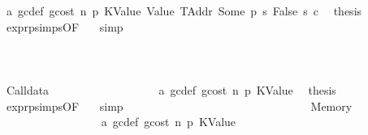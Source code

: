 \begin{isabellebody}
\ a{}\ gc{\isacharunderscore}{\kern0pt}def\ gcost\ n\ p{}\ KValue\ Value\ TAddr\ Some\ p{}\ s{}\ False\ s{}\ c\ \isamarkupfalse%
\ {\isacharquery}{\kern0pt}thesis\ \isamarkupfalse%
\ expr{\isachardot}{\kern0pt}psimps{\isacharparenleft}{\kern0pt}{}{}{\isacharparenright}{\kern0pt}{\isacharbrackleft}{\kern0pt}OF\ {}{}{\isacharparenleft}{\kern0pt}{}{\isacharparenright}{\kern0pt}{\isacharbrackright}{\kern0pt}\ \isamarkupfalse%
\ simp\isanewline
\ \ \ \ \ \ \ \ \ \ \ \ \ \ \ \ \ \ \ \ \ \ \ \ \ \ \ \ \ \ \isamarkupfalse%
\isanewline
\ \ \ \ \ \ \ \ \ \ \ \ \ \ \ \ \ \ \ \ \ \ \ \ \ \ \ \ \isamarkupfalse%
\isanewline
\ \ \ \ \ \ \ \ \ \ \ \ \ \ \ \ \ \ \ \ \ \ \ \ \ \ \isamarkupfalse%
\isanewline
\ \ \ \ \ \ \ \ \ \ \ \ \ \ \ \ \ \ \ \ \ \ \ \ \isamarkupfalse%
\isanewline
\ \ \ \ \ \ \ \ \ \ \ \ \ \ \ \ \ \ \ \ \ \ \isamarkupfalse%
\isanewline
\ \ \ \ \ \ \ \ \ \ \ \ \ \ \ \ \ \ \ \ \isamarkupfalse%
\isanewline
\ \ \ \ \ \ \ \ \ \ \ \ \ \ \ \ \ \ \isamarkupfalse%
\isanewline
\ \ \ \ \ \ \ \ \ \ \ \ \ \ \ \ \isamarkupfalse%
\isanewline
\ \ \ \ \ \ \ \ \ \ \ \ \ \ \isamarkupfalse%
\isanewline
\ \ \ \ \ \ \ \ \ \ \ \ \ \ \ \ \isamarkupfalse%
\ {\isacharparenleft}{\kern0pt}Calldata\ {\isacharunderscore}{\kern0pt}{\isacharparenright}{\kern0pt}\isanewline
\ \ \ \ \ \ \ \ \ \ \ \ \ \ \ \ \isamarkupfalse%
\ a{}\ gc{\isacharunderscore}{\kern0pt}def\ gcost\ n\ p{}\ KValue\ \isamarkupfalse%
\ {\isacharquery}{\kern0pt}thesis\ \isamarkupfalse%
\ expr{\isachardot}{\kern0pt}psimps{\isacharparenleft}{\kern0pt}{}{}{\isacharparenright}{\kern0pt}{\isacharbrackleft}{\kern0pt}OF\ {}{}{\isacharparenleft}{\kern0pt}{}{\isacharparenright}{\kern0pt}{\isacharbrackright}{\kern0pt}\ \isamarkupfalse%
\ simp\isanewline
\ \ \ \ \ \ \ \ \ \ \ \ \ \ \isamarkupfalse%
\isanewline
\ \ \ \ \ \ \ \ \ \ \ \ \ \ \ \ \isamarkupfalse%
\ {\isacharparenleft}{\kern0pt}Memory\ {\isacharunderscore}{\kern0pt}{\isacharparenright}{\kern0pt}\isanewline
\ \ \ \ \ \ \ \ \ \ \ \ \ \ \ \ \isamarkupfalse%
\ a{}\ gc{\isacharunderscore}{\kern0pt}def\ gcost\ n\ p{}\ KValue\ \isamarkupfalse%

\end{isabellebody}
